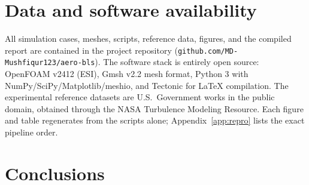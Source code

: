 \documentclass[11pt,a4paper]{article}
\begin{document}
\section{Data and software availability}
All simulation cases, meshes, scripts, reference data, figures, and the compiled report are contained in the project repository (\texttt{github.com/MD-Mushfiqur123/aero-bls}). The software stack is entirely open source: OpenFOAM v2412 (ESI), Gmsh v2.2 mesh format, Python 3 with NumPy/SciPy/Matplotlib/meshio, and Tectonic for \LaTeX{} compilation. The experimental reference datasets are U.S.\ Government works in the public domain, obtained through the NASA Turbulence Modeling Resource. Each figure and table regenerates from the scripts alone; Appendix~\ref{app:repro} lists the exact pipeline order.

\section{Conclusions}
\end{document}
